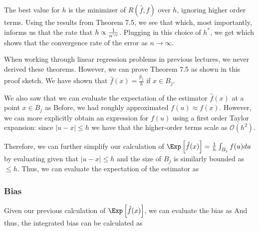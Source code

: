 The best value for $h$ is the minimizer of $R(\hat{f}, f)$ over $h$, ignoring higher order terms. Using the results from Theorem 7.5, we see that
which, most importantly, informs us that the rate that $h \propto \frac{1}{n^{\sfrac{1}{3}}}$. 
Plugging in this choice of $h^*$, we get 
which shows that the convergence rate of the error as $n \to \infty$.


When working through linear regression problems in previous lectures, we never derived these theorems. However, we can prove Theorem 7.5 as shown in this proof sketch.  We have shown that $\hat{f}(x) = \frac{\hat{p}_j}{h}$ if $x \in B_j$. 

We also saw that we can evaluate the expectation of the estimator $\hat{f}(x)$ at a point  $x \in B_j$ as 
Before, we had roughly approximated $f(u) \approx f(x)$. However, we can more explicitly obtain an expression for $f(u)$ using a first order Taylor expansion:
since $\lvert u-x \rvert \leq h$ we have that the higher-order terms scale as $\mathcal{O}(h^2)$.

Therefore, we can further simplify our calculation of $\Exp\left[\hat{f}(x)\right] = \frac{1}{h} \int_{B_j} f(u)du$ by evaluating
given that $\lvert u-x \rvert \leq h$ and the size of $B_j$ is similarly bounded as $\leq h$.  Thus, we can evaluate the expectation of the estimator as

\subsubsection{Bias}
Given our previous calculation of $\Exp\left[\hat{f}(x)\right]$, we can evaluate the bias as
And thus, the integrated bias can be calculated as

